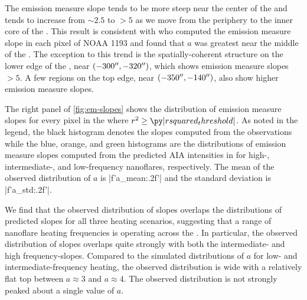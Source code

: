 The emission measure slope tends to be more steep near the center of the \AR{} and tends to increase from $\sim2.5$ to $>5$ as we move from the periphery to the inner core of the \AR{}.
This result is consistent with \citet{del_zanna_evolution_2015} who computed the emission measure slope in each pixel of \AR{} NOAA 1193 and found that $a$ was greatest near the middle of the \AR{}.
The exception to this trend is the spatially-coherent structure on the lower edge of the \AR{}, near $(-300\mbox{$^{\prime\prime}$},-320\mbox{$^{\prime\prime}$})$, which shows emission measure slopes $>5$.
A few regions on the top edge, near $(-350\mbox{$^{\prime\prime}$},-140\mbox{$^{\prime\prime}$})$, also show higher emission measure slopes.

The right panel of \autoref{fig:em-slopes} shows the distribution of emission measure slopes for every pixel in the \AR{} where $r^2\ge\py|rsquared_threshold|$.
As noted in the legend, the black histogram denotes the slopes computed from the observations while the blue, orange, and green histograms are the distributions of emission measure slopes computed from the predicted AIA intensities in  for high-, intermediate-, and low-frequency nanoflares, respectively.
The mean of the observed distribution of $a$ is \py[manager_em]|f'{a_mean:.2f}'| and the standard deviation is \py[manager_em]|f'{a_std:.2f}'|. 

We find that the observed distribution of slopes overlaps the distributions of predicted slopes for all three heating scenarios, suggesting that a range of nanoflare heating frequencies is operating across the \AR.
In particular, the observed distribution of slopes overlaps quite strongly with both the intermediate- and high frequency-slopes.
Compared to the simulated distributions of $a$ for low- and intermediate-frequency heating, the observed distribution is wide with a relatively flat top between $a\approx3$ and $a\approx4$.
The observed distribution is not strongly peaked about a single value of $a$.

